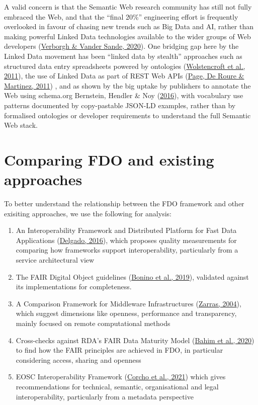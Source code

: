 A valid concern is that the Semantic Web research community has still not fully embraced the Web, and that the ``final 20\%'' engineering effort is frequently overlooked in favour of chasing new trends such as Big Data and AI, rather than making powerful Linked Data technologies available to the wider groups of Web developers (\protect\hyperlink{ref-jHwttlTs}{Verborgh \& Vander Sande, 2020}). One bridging gap here by the Linked Data movement has been ``linked data by stealth'' approaches such as structured data entry spreadsheets powered by ontologies (\protect\hyperlink{ref-MhsCt4P3}{Wolstencroft et al., 2011}), the use of Linked Data as part of REST Web APIs (\protect\hyperlink{ref-eS6a6tlz}{Page, De Roure \& Martinez, 2011}) , and as shown by the big uptake by publishers to annotate the Web using schema.org Bernstein, Hendler \& Noy (\protect\hyperlink{ref-117tX9MEG}{2016}), with vocabulary use patterns documented by copy-pastable JSON-LD examples, rather than by formalised ontologies or developer requirements to understand the full Semantic Web stack.

\hypertarget{sec:comparing}{%
\section{Comparing FDO and existing approaches}\label{sec:comparing}}

To better understand the relationship between the FDO framework and other exisiting approaches, we use the following for analysis:

\begin{enumerate}
\def\labelenumi{\arabic{enumi}.}
\tightlist
\item
  An Interoperability Framework and Distributed Platform for Fast Data Applications (\protect\hyperlink{ref-KlCFFFyL}{Delgado, 2016}), which proposes quality measurements for comparing how frameworks support interoperability, particularly from a service architectural view
\item
  The FAIR Digital Object guidelines (\protect\hyperlink{ref-RwvirqWg}{Bonino et al., 2019}), validated against its implementations for completeness.
\item
  A Comparison Framework for Middleware Infrastructures (\protect\hyperlink{ref-hRzcHhPD}{Zarras, 2004}), which suggest dimensions like openness, performance and transparency, mainly focused on remote computational methods
\item
  Cross-checks against RDA's FAIR Data Maturity Model (\protect\hyperlink{ref-UzQhqk0M}{Bahim et al., 2020}) to find how the FAIR principles are achieved in FDO, in particular considering access, sharing and openness
\item
  EOSC Interoperability Framework (\protect\hyperlink{ref-aCye3KpE}{Corcho et al., 2021}) which gives recommendations for technical, semantic, organisational and legal interoperability, particularly from a metadata perspective
\end{enumerate}

